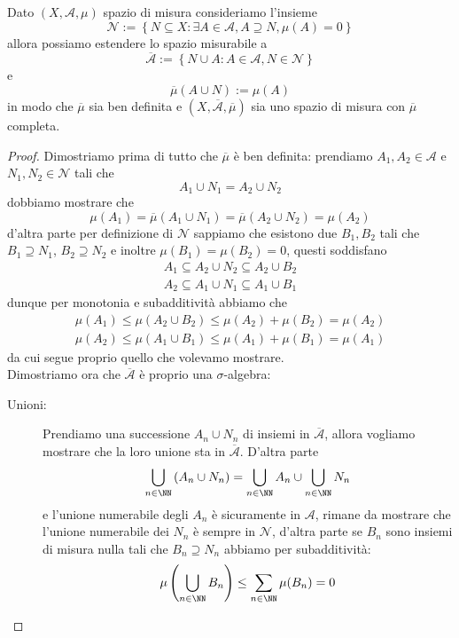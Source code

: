 \documentclass[11pt]{scrartcl}
\begin{document}
	\begin{proposition}
		Dato $(X,\mathcal{A},\mu)$ spazio di misura consideriamo l'insieme
		$$\mathcal{N}:=\left\{N\subseteq X:\exists A \in \mathcal{A}, A\supseteq N, \mu(A)=0\right\}$$
		allora possiamo estendere lo spazio misurabile a
		$$\overline{\mathcal{A}}:=\left\{N\cup A:A\in \mathcal{A},N\in\mathcal{N}\right\}$$
		e 
		$$\overline{\mu}(A\cup N):=\mu(A)$$
		in modo che $\overline{\mu}$ sia ben definita e $(X,\overline{\mathcal{A}},\overline{\mu})$ sia uno spazio di misura con $\overline{\mu}$ completa.
	\end{proposition}
	\begin{proof}
		Dimostriamo prima di tutto che $\overline{\mu}$ è ben definita: prendiamo $A_1,A_2\in \mathcal{A}$ e $N_1,N_2\in\mathcal{N}$ tali che
		$$A_1\cup N_1=A_2\cup N_2$$
		dobbiamo mostrare che 
		$$\mu(A_1)=\overline{\mu}(A_1\cup N_1)=\overline{\mu}(A_2\cup N_2)=\mu(A_2)$$
		d'altra parte per definizione di $\mathcal{N}$ sappiamo che esistono due $B_1,B_2$ tali che $B_1\supseteq N_1$, $B_2\supseteq N_2$ e inoltre $\mu(B_1)=\mu(B_2)=0$, questi soddisfano
		\begin{gather*}
			A_1\subseteq A_2\cup N_2 \subseteq A_2\cup B_2 \\
			A_2\subseteq A_1\cup N_1 \subseteq A_1\cup B_1
		\end{gather*}
		dunque per monotonia e subadditività abbiamo che
		\begin{gather*}
			\mu(A_1)\le \mu\left(A_2\cup B_2\right)\le\mu(A_2)+\mu(B_2)=\mu(A_2) \\
			\mu(A_2)\le \mu\left(A_1\cup B_1\right)\le\mu(A_1)+\mu(B_1)=\mu(A_1)
		\end{gather*}
		da cui segue proprio quello che volevamo mostrare. \\
		Dimostriamo ora che $\overline{\mathcal{A}}$ è proprio una $\sigma$-algebra:
		\begin{description}
			\item[Unioni:] Prendiamo una successione $A_n\cup N_n$ di insiemi in $\overline{\mathcal{A}}$, allora vogliamo mostrare che la loro unione sta in $\overline{\mathcal{A}}$. D'altra parte
			$$\bigcup_{n\in \NN}\left(A_n\cup N_n\right)=\bigcup_{n\in \NN}A_n\cup \bigcup_{n\in\NN}N_n$$
			e l'unione numerabile degli $A_n$ è sicuramente in $\mathcal{A}$, rimane da mostrare che l'unione numerabile dei $N_n$ è sempre in $\mathcal{N}$, d'altra parte se $B_n$ sono insiemi di misura nulla tali che $B_n\supseteq N_n$ abbiamo per subadditività:
			$$\mu\left(\bigcup_{n\in \NN}B_n\right)\le \sum_{n\in\NN}\mu(B_n)=0$$

\end{description}
\end{proof}
\end{document}
